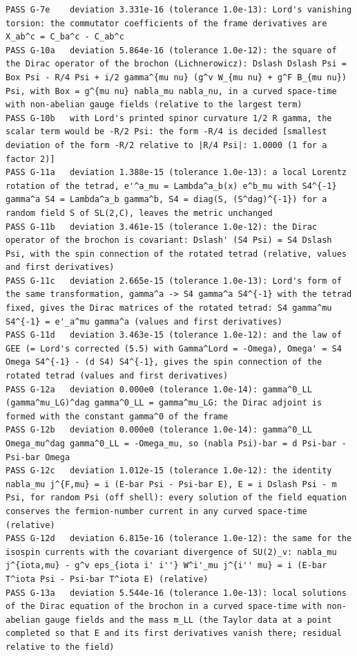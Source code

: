\documentclass[
  10pt,
]{article}
\begin{document}
\begin{verbatim}
PASS G-7e    deviation 3.331e-16 (tolerance 1.0e-13): Lord's vanishing torsion: the commutator coefficients of the frame derivatives are X_ab^c = C_ba^c - C_ab^c
PASS G-10a   deviation 5.864e-16 (tolerance 1.0e-12): the square of the Dirac operator of the brochon (Lichnerowicz): Dslash Dslash Psi = Box Psi - R/4 Psi + i/2 gamma^{mu nu} (g^v W_{mu nu} + g^F B_{mu nu}) Psi, with Box = g^{mu nu} nabla_mu nabla_nu, in a curved space-time with non-abelian gauge fields (relative to the largest term)
PASS G-10b   with Lord's printed spinor curvature 1/2 R gamma, the scalar term would be -R/2 Psi: the form -R/4 is decided [smallest deviation of the form -R/2 relative to |R/4 Psi|: 1.0000 (1 for a factor 2)]
PASS G-11a   deviation 1.388e-15 (tolerance 1.0e-13): a local Lorentz rotation of the tetrad, e'^a_mu = Lambda^a_b(x) e^b_mu with S4^{-1} gamma^a S4 = Lambda^a_b gamma^b, S4 = diag(S, (S^dag)^{-1}) for a random field S of SL(2,C), leaves the metric unchanged
PASS G-11b   deviation 3.461e-15 (tolerance 1.0e-12): the Dirac operator of the brochon is covariant: Dslash' (S4 Psi) = S4 Dslash Psi, with the spin connection of the rotated tetrad (relative, values and first derivatives)
PASS G-11c   deviation 2.665e-15 (tolerance 1.0e-13): Lord's form of the same transformation, gamma^a -> S4 gamma^a S4^{-1} with the tetrad fixed, gives the Dirac matrices of the rotated tetrad: S4 gamma^mu S4^{-1} = e'_a^mu gamma^a (values and first derivatives)
PASS G-11d   deviation 3.463e-15 (tolerance 1.0e-12): and the law of GEE (= Lord's corrected (5.5) with Gamma^Lord = -Omega), Omega' = S4 Omega S4^{-1} - (d S4) S4^{-1}, gives the spin connection of the rotated tetrad (values and first derivatives)
PASS G-12a   deviation 0.000e0 (tolerance 1.0e-14): gamma^0_LL (gamma^mu_LG)^dag gamma^0_LL = gamma^mu_LG: the Dirac adjoint is formed with the constant gamma^0 of the frame
PASS G-12b   deviation 0.000e0 (tolerance 1.0e-14): gamma^0_LL Omega_mu^dag gamma^0_LL = -Omega_mu, so (nabla Psi)-bar = d Psi-bar - Psi-bar Omega
PASS G-12c   deviation 1.012e-15 (tolerance 1.0e-12): the identity nabla_mu j^{F,mu} = i (E-bar Psi - Psi-bar E), E = i Dslash Psi - m Psi, for random Psi (off shell): every solution of the field equation conserves the fermion-number current in any curved space-time (relative)
PASS G-12d   deviation 6.815e-16 (tolerance 1.0e-12): the same for the isospin currents with the covariant divergence of SU(2)_v: nabla_mu j^{iota,mu} - g^v eps_{iota i' i''} W^i'_mu j^{i'' mu} = i (E-bar T^iota Psi - Psi-bar T^iota E) (relative)
PASS G-13a   deviation 5.544e-16 (tolerance 1.0e-13): local solutions of the Dirac equation of the brochon in a curved space-time with non-abelian gauge fields and the mass m_LL (the Taylor data at a point completed so that E and its first derivatives vanish there; residual relative to the field)

\end{verbatim}
\end{document}
